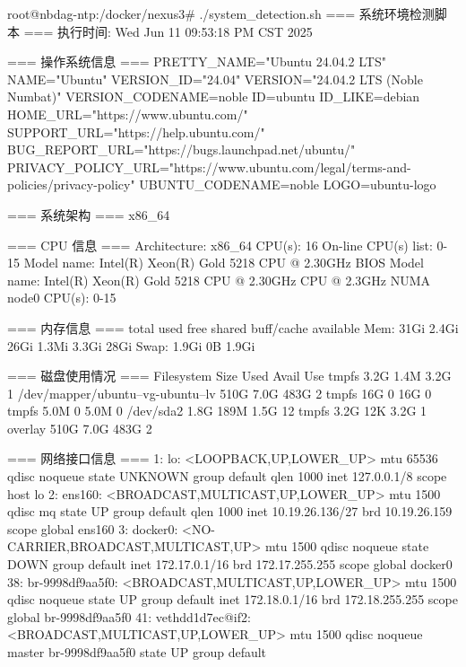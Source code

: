 root@nbdag-ntp:/docker/nexus3# ./system_detection.sh
=== 系统环境检测脚本 ===
执行时间: Wed Jun 11 09:53:18 PM CST 2025

=== 操作系统信息 ===
PRETTY_NAME="Ubuntu 24.04.2 LTS"
NAME="Ubuntu"
VERSION_ID="24.04"
VERSION="24.04.2 LTS (Noble Numbat)"
VERSION_CODENAME=noble
ID=ubuntu
ID_LIKE=debian
HOME_URL="https://www.ubuntu.com/"
SUPPORT_URL="https://help.ubuntu.com/"
BUG_REPORT_URL="https://bugs.launchpad.net/ubuntu/"
PRIVACY_POLICY_URL="https://www.ubuntu.com/legal/terms-and-policies/privacy-policy"
UBUNTU_CODENAME=noble
LOGO=ubuntu-logo

=== 系统架构 ===
x86_64

=== CPU 信息 ===
Architecture:                         x86_64
CPU(s):                               16
On-line CPU(s) list:                  0-15
Model name:                           Intel(R) Xeon(R) Gold 5218 CPU @ 2.30GHz
BIOS Model name:                      Intel(R) Xeon(R) Gold 5218 CPU @ 2.30GHz  CPU @ 2.3GHz
NUMA node0 CPU(s):                    0-15

=== 内存信息 ===
               total        used        free      shared  buff/cache   available
Mem:            31Gi       2.4Gi        26Gi       1.3Mi       3.3Gi        28Gi
Swap:          1.9Gi          0B       1.9Gi

=== 磁盘使用情况 ===
Filesystem                         Size  Used Avail Use%
tmpfs                              3.2G  1.4M  3.2G   1%
/dev/mapper/ubuntu--vg-ubuntu--lv  510G  7.0G  483G   2%
tmpfs                               16G     0   16G   0%
tmpfs                              5.0M     0  5.0M   0%
/dev/sda2                          1.8G  189M  1.5G  12%
tmpfs                              3.2G   12K  3.2G   1%
overlay                            510G  7.0G  483G   2%

=== 网络接口信息 ===
1: lo: <LOOPBACK,UP,LOWER_UP> mtu 65536 qdisc noqueue state UNKNOWN group default qlen 1000
    inet 127.0.0.1/8 scope host lo
2: ens160: <BROADCAST,MULTICAST,UP,LOWER_UP> mtu 1500 qdisc mq state UP group default qlen 1000
    inet 10.19.26.136/27 brd 10.19.26.159 scope global ens160
3: docker0: <NO-CARRIER,BROADCAST,MULTICAST,UP> mtu 1500 qdisc noqueue state DOWN group default
    inet 172.17.0.1/16 brd 172.17.255.255 scope global docker0
38: br-9998df9aa5f0: <BROADCAST,MULTICAST,UP,LOWER_UP> mtu 1500 qdisc noqueue state UP group default
    inet 172.18.0.1/16 brd 172.18.255.255 scope global br-9998df9aa5f0
41: vethdd1d7ec@if2: <BROADCAST,MULTICAST,UP,LOWER_UP> mtu 1500 qdisc noqueue master br-9998df9aa5f0 state UP group default

